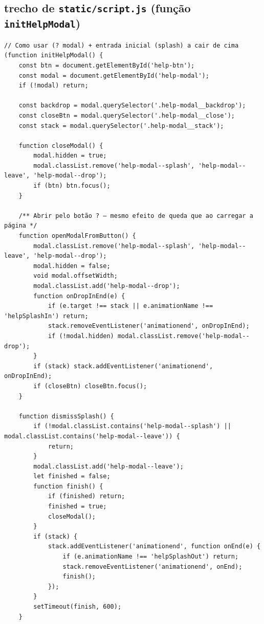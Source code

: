 \subsection*{trecho de \texttt{static/script.js} (função \texttt{initHelpModal})}
\begin{verbatim}
// Como usar (? modal) + entrada inicial (splash) a cair de cima
(function initHelpModal() {
    const btn = document.getElementById('help-btn');
    const modal = document.getElementById('help-modal');
    if (!modal) return;

    const backdrop = modal.querySelector('.help-modal__backdrop');
    const closeBtn = modal.querySelector('.help-modal__close');
    const stack = modal.querySelector('.help-modal__stack');

    function closeModal() {
        modal.hidden = true;
        modal.classList.remove('help-modal--splash', 'help-modal--leave', 'help-modal--drop');
        if (btn) btn.focus();
    }

    /** Abrir pelo botão ? — mesmo efeito de queda que ao carregar a página */
    function openModalFromButton() {
        modal.classList.remove('help-modal--splash', 'help-modal--leave', 'help-modal--drop');
        modal.hidden = false;
        void modal.offsetWidth;
        modal.classList.add('help-modal--drop');
        function onDropInEnd(e) {
            if (e.target !== stack || e.animationName !== 'helpSplashIn') return;
            stack.removeEventListener('animationend', onDropInEnd);
            if (!modal.hidden) modal.classList.remove('help-modal--drop');
        }
        if (stack) stack.addEventListener('animationend', onDropInEnd);
        if (closeBtn) closeBtn.focus();
    }

    function dismissSplash() {
        if (!modal.classList.contains('help-modal--splash') || modal.classList.contains('help-modal--leave')) {
            return;
        }
        modal.classList.add('help-modal--leave');
        let finished = false;
        function finish() {
            if (finished) return;
            finished = true;
            closeModal();
        }
        if (stack) {
            stack.addEventListener('animationend', function onEnd(e) {
                if (e.animationName !== 'helpSplashOut') return;
                stack.removeEventListener('animationend', onEnd);
                finish();
            });
        }
        setTimeout(finish, 600);
    }


\end{verbatim}
